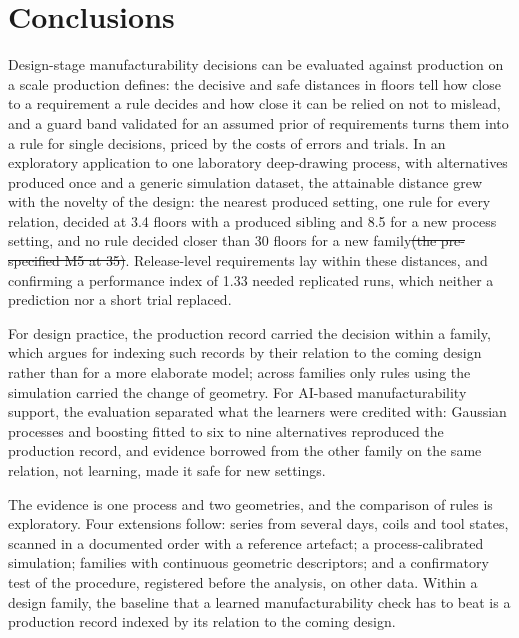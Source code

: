\documentclass[pdflatex,sn-basic,lineno]{sn-jnl}
\providecommand{\DIFadd}[1]{{\protect\color{blue}\uwave{#1}}} %
\providecommand{\DIFdel}[1]{{\protect\color{red}\sout{#1}}}                      %
\providecommand{\DIFaddbegin}{} %
\providecommand{\DIFaddend}{} %
\providecommand{\DIFdelbegin}{} %
\providecommand{\DIFdelend}{} %
\newcommand{\DIFscaledelfig}{0.5}
\newlength{\DIFdelgraphicswidth} %
\newlength{\DIFdelgraphicsheight} %
\newcommand{\DIFaddincludegraphics}[2][]{{\color{blue}\fbox{\DIFOincludegraphics[#1]{#2}}}} %
\newcommand{\DIFdelincludegraphics}[2][]{%
\sbox{\DIFdelgraphicsbox}{\DIFOincludegraphics[#1]{#2}}%
\settoboxwidth{\DIFdelgraphicswidth}{\DIFdelgraphicsbox} %
\settoboxtotalheight{\DIFdelgraphicsheight}{\DIFdelgraphicsbox} %
\scalebox{\DIFscaledelfig}{%
\parbox[b]{\DIFdelgraphicswidth}{\usebox{\DIFdelgraphicsbox}\\[-\baselineskip] \rule{\DIFdelgraphicswidth}{0em}}\llap{\resizebox{\DIFdelgraphicswidth}{\DIFdelgraphicsheight}{%
\setlength{\unitlength}{\DIFdelgraphicswidth}%
\begin{picture}(1,1)%
\thicklines\linethickness{2pt} %
{\color[rgb]{1,0,0}\put(0,0){\framebox(1,1){}}}%
{\color[rgb]{1,0,0}\put(0,0){\line( 1,1){1}}}%
{\color[rgb]{1,0,0}\put(0,1){\line(1,-1){1}}}%
\end{picture}%
}\hspace*{3pt}}} %
} %
\DeclareRobustCommand{\DIFaddbegin}{\DIFOaddbegin \let\includegraphics\DIFaddincludegraphics} %
\DeclareRobustCommand{\DIFaddend}{\DIFOaddend \let\includegraphics\DIFOincludegraphics} %
\DeclareRobustCommand{\DIFdelbegin}{\DIFOdelbegin \let\includegraphics\DIFdelincludegraphics} %
\DeclareRobustCommand{\DIFdelend}{\DIFOaddend \let\includegraphics\DIFOincludegraphics} %
\begin{document}
\section{Conclusions}\label{sec:conclusion}

Design-stage manufacturability decisions can be evaluated against production on a scale production defines: the decisive and safe distances in floors tell how close to a requirement a rule decides and how close it can be relied on not to mislead, and a guard band validated for an assumed prior of requirements turns them into a rule for single decisions, priced by the costs of errors and trials. In an exploratory application to one laboratory deep-drawing process, with alternatives produced once and a generic simulation dataset, the attainable distance grew with the novelty of the design: the nearest produced setting, one rule for every relation, decided at 3.4 floors with a produced sibling and 8.5 for a new process setting, and no rule decided closer than 30 floors for a new family\DIFdelbegin \DIFdel{(the pre-specified M5 at 35)}\DIFdelend . Release-level requirements lay within these distances, and \DIFaddbegin \DIFadd{once runs differed by a floor, }\DIFaddend confirming a performance index of 1.33 needed replicated runs, which neither a prediction nor a short trial replaced.

For design practice, the production record carried the decision within a family, which argues for indexing such records by their relation to the coming design rather than for a more elaborate model; across families only rules using the simulation carried the change of geometry. For AI-based manufacturability support, the evaluation separated what the learners were credited with: Gaussian processes and boosting fitted to six to nine alternatives reproduced the production record, and evidence borrowed from the other family on the same relation, not learning, made it safe for new settings.

The evidence is one process and two geometries, and the comparison of rules is exploratory. Four extensions follow: series from several days, coils and tool states, scanned in a documented order with a reference artefact; a process-calibrated simulation; families with continuous geometric descriptors; and a confirmatory test of the procedure, registered before the analysis, on other data. Within a design family, the baseline that a learned manufacturability check has to beat is a production record indexed by its relation to the coming design.
\end{document}
